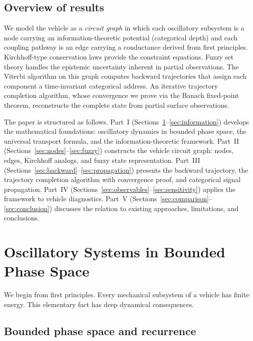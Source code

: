 \documentclass[twocolumn,10pt,a4paper]{article}
\theoremstyle{definition}
\theoremstyle{remark}
\begin{document}
\subsection{Overview of results}

We model the vehicle as a \emph{circuit graph} in which each oscillatory subsystem is a node carrying an information-theoretic potential (categorical depth) and each coupling pathway is an edge carrying a conductance derived from first principles. Kirchhoff-type conservation laws provide the constraint equations. Fuzzy set theory handles the epistemic uncertainty inherent in partial observations. The Viterbi algorithm on this graph computes backward trajectories that assign each component a time-invariant categorical address. An iterative trajectory completion algorithm, whose convergence we prove via the Banach fixed-point theorem, reconstructs the complete state from partial surface observations.

The paper is structured as follows. Part~I (Sections~\ref{sec:oscillatory}--\ref{sec:information}) develops the mathematical foundations: oscillatory dynamics in bounded phase space, the universal transport formula, and the information-theoretic framework. Part~II (Sections~\ref{sec:nodes}--\ref{sec:fuzzy}) constructs the vehicle circuit graph: nodes, edges, Kirchhoff analogs, and fuzzy state representation. Part~III (Sections~\ref{sec:backward}--\ref{sec:propagation}) presents the backward trajectory, the trajectory completion algorithm with convergence proof, and categorical signal propagation. Part~IV (Sections~\ref{sec:observables}--\ref{sec:sensitivity}) applies the framework to vehicle diagnostics. Part~V (Sections~\ref{sec:comparison}--\ref{sec:conclusion}) discusses the relation to existing approaches, limitations, and conclusions.


\section{Oscillatory Systems in Bounded Phase Space}\label{sec:oscillatory}

We begin from first principles. Every mechanical subsystem of a vehicle has finite energy. This elementary fact has deep dynamical consequences.

\subsection{Bounded phase space and recurrence}
\end{document}
